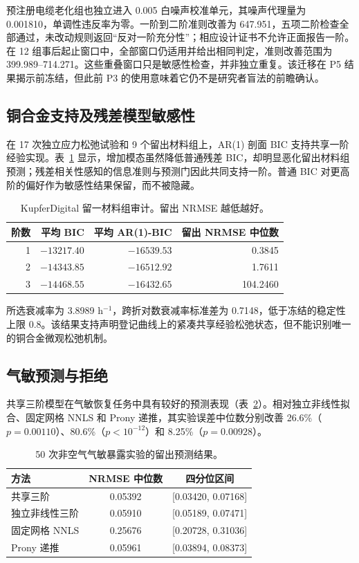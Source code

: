 \documentclass[UTF8,11pt]{ctexart}
\begin{document}
预注册电缆老化组也独立进入 0.005 白噪声校准单元，其噪声代理量为 0.001810，单调性违反率为零。一阶到二阶准则改善为 647.951，五项二阶检查全部通过，未改动规则返回“反对一阶充分性”；相应设计证书不允许正面报告一阶。在 12 组事后起止窗口中，全部窗口仍适用并给出相同判定，准则改善范围为 399.989--714.271。这些重叠窗口只是敏感性检查，并非独立重复。该迁移在 P5 结果揭示前冻结，但此前 P3 的使用意味着它仍不是研究者盲法的前瞻确认。

\subsection{铜合金支持及残差模型敏感性}
在 17 次独立应力松弛试验和 9 个留出材料组上，AR(1) 剖面 BIC 支持共享一阶经验实现。表~\ref{tab:kupfer-zh} 显示，增加模态虽然降低普通残差 BIC，却明显恶化留出材料组预测；残差相关性感知的信息准则与预测门因此共同支持一阶。普通 BIC 对更高阶的偏好作为敏感性结果保留，而不被隐藏。

\begin{table}[H]
\centering
\caption{KupferDigital 留一材料组审计。留出 NRMSE 越低越好。}
\label{tab:kupfer-zh}
\begin{tabular}{rrrr}
\toprule
阶数 & 平均 BIC & 平均 AR(1)-BIC & 留出 NRMSE 中位数\\
\midrule
1 & $-13217.40$ & $-16539.53$ & 0.3845\\
2 & $-14343.85$ & $-16512.92$ & 1.7611\\
3 & $-14468.55$ & $-16432.65$ & 104.2460\\
\bottomrule
\end{tabular}
\end{table}

所选衰减率为 3.8989 h$^{-1}$，跨折对数衰减率标准差为 0.7148，低于冻结的稳定性上限 0.8。该结果支持声明登记曲线上的紧凑共享经验松弛状态，但不能识别唯一的铜合金微观松弛机制。

\subsection{气敏预测与拒绝}
共享三阶模型在气敏恢复任务中具有较好的预测表现（表~\ref{tab:gas-zh}）。相对独立非线性拟合、固定网格 NNLS 和 Prony 递推，其实验误差中位数分别改善 26.6\%（$p=0.00110$）、80.6\%（$p<10^{-12}$）和 8.25\%（$p=0.00928$）。

\begin{table}[H]
\centering
\caption{50 次非空气气敏暴露实验的留出预测结果。}
\label{tab:gas-zh}
\begin{tabular}{lcc}
\toprule
方法 & NRMSE 中位数 & 四分位区间\\
\midrule
共享三阶 & 0.05392 & [0.03420, 0.07168]\\
独立非线性三阶 & 0.05910 & [0.05189, 0.07471]\\
固定网格 NNLS & 0.25676 & [0.20728, 0.31036]\\
Prony 递推 & 0.05961 & [0.03894, 0.08373]\\
\bottomrule
\end{tabular}
\end{table}
\end{document}
